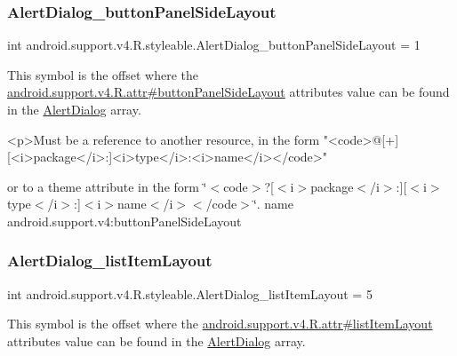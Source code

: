 \subsubsection{\texorpdfstring{Alert\+Dialog\+\_\+button\+Panel\+Side\+Layout}{AlertDialog\_buttonPanelSideLayout}}
{\footnotesize\ttfamily int android.\+support.\+v4.\+R.\+styleable.\+Alert\+Dialog\+\_\+button\+Panel\+Side\+Layout = 1\hspace{0.3cm}{\ttfamily [static]}}

This symbol is the offset where the \hyperlink{classandroid_1_1support_1_1v4_1_1R_1_1attr_a7307a34f07a4a79b917e25e56bc4047d}{android.\+support.\+v4.\+R.\+attr\#button\+Panel\+Side\+Layout} attribute\textquotesingle{}s value can be found in the \hyperlink{classandroid_1_1support_1_1v4_1_1R_1_1styleable_a5116e3c5b33ab9db032c1574d2588f5e}{Alert\+Dialog} array.

\begin{DoxyVerb}      <p>Must be a reference to another resource, in the form "<code>@[+][<i>package</i>:]<i>type</i>:<i>name</i></code>"
\end{DoxyVerb}
 or to a theme attribute in the form \char`\"{}$<$code$>$?\mbox{[}$<$i$>$package$<$/i$>$\+:\mbox{]}\mbox{[}$<$i$>$type$<$/i$>$\+:\mbox{]}$<$i$>$name$<$/i$>$$<$/code$>$\char`\"{}.  name android.\+support.\+v4\+:button\+Panel\+Side\+Layout \mbox{\label{classandroid_1_1support_1_1v4_1_1R_1_1styleable_abd795c00cd69a69a92b9953b1ebe8394}} 
\subsubsection{\texorpdfstring{Alert\+Dialog\+\_\+list\+Item\+Layout}{AlertDialog\_listItemLayout}}
{\footnotesize\ttfamily int android.\+support.\+v4.\+R.\+styleable.\+Alert\+Dialog\+\_\+list\+Item\+Layout = 5\hspace{0.3cm}{\ttfamily [static]}}

This symbol is the offset where the \hyperlink{classandroid_1_1support_1_1v4_1_1R_1_1attr_ac152e1975a0059d413c9b97ed9841b7b}{android.\+support.\+v4.\+R.\+attr\#list\+Item\+Layout} attribute\textquotesingle{}s value can be found in the \hyperlink{classandroid_1_1support_1_1v4_1_1R_1_1styleable_a5116e3c5b33ab9db032c1574d2588f5e}{Alert\+Dialog} array.

